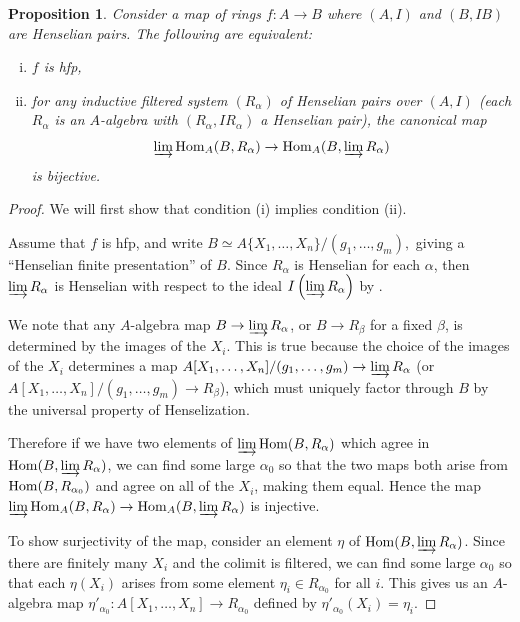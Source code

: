 \documentclass[12pt]{article}
\newcommand{\Hom}{{\rm Hom}}
\newcommand{\colim}{\varinjlim}
\newcommand{\hfp}{hfp\xspace}
\newcommand{\spcite}[2]{\cite[\href{https://stacks.math.columbia.edu/tag/#1}{{#2} {#1}}]{stackp}}
\newtheorem{proposition}[theorem]{Proposition}
\theoremstyle{definition}
\numberwithin{equation}{subsection}
\begin{document}
\begin{proposition}\label{prop:groth} Consider a map of rings $f: A \to B$ where $(A,I)$ and $(B,IB)$ are Henselian pairs. The following are equivalent:

\begin{enumerate}[(i)]
\item $f$ is \hfp,
\item for any inductive filtered system $(R_\alpha)$ of Henselian pairs over $(A,I)$ (each $R_\alpha$ is an $A$-algebra with $(R_\alpha,IR_\alpha)$ a Henselian pair), the canonical map $$\colim \Hom_A(B,R_\alpha) \to \Hom_A(B,\colim R_\alpha)$$ is bijective.

\end{enumerate}

\end{proposition}
\begin{proof}

We will first show that condition (i) implies condition (ii).

Assume that $f$ is \hfp, and write $B \simeq A\{X_1,\dots,X_n\}/(g_1,\dots,g_m),$ giving a ``Henselian finite presentation'' of $B$. Since $R_\alpha$ is Henselian for each $\alpha$, then $\colim R_\alpha$ is Henselian with respect to the ideal $I\left(\colim R_\alpha\right)$ by \spcite{0FWT}{Lemma}.

We note that any $A$-algebra map $B \to \colim R_\alpha$, or $B \to R_\beta$ for a fixed $\beta$, is determined by the images of the $X_i$. This is true because the choice of the images of the $X_i$ determines a map $A[X_1,\dots,X_n]/(g_1,\dots,g_m) \to \colim R_\alpha$ (or $A[X_1,\dots,X_n]/(g_1,\dots,g_m) \to R_\beta$), which must uniquely factor through $B$ by the universal property of Henselization.

Therefore if we have two elements of $\colim \Hom(B,R_\alpha)$ which agree in $\Hom(B,\colim R_\alpha)$, we can find some large $\alpha_0$ so that the two maps both arise from $\Hom(B,R_{\alpha_0})$ and agree on all of the $X_i$, making them equal. Hence the map $\colim \Hom_A(B,R_\alpha) \to \Hom_A(B,\colim R_\alpha)$ is injective.

To show surjectivity of the map, consider an element $\eta$ of $\Hom(B,\colim R_\alpha)$. Since there are finitely many $X_i$ and the colimit is filtered, we can find some large $\alpha_0$ so that each $\eta(X_i)$ arises from some element $\eta_i \in R_{\alpha_0}$ for all $i$. This gives us an $A$-algebra map $\eta'_{\alpha_0}: A[X_1,\dots,X_n] \to R_{\alpha_0}$ defined by $\eta'_{\alpha_0}(X_i)=\eta_i$.


\end{proof}
\end{document}
